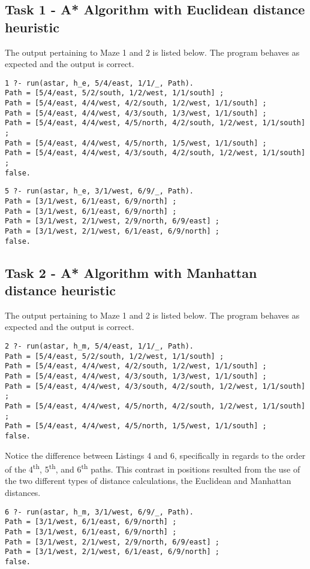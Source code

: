 \documentclass[11pt]{article}
\newcommand{\forceindent}{\leavevmode{\parindent=1em\indent}}
\newcommand{\ts}{\textsuperscript}
\begin{document}
\subsection{Task 1 - A* Algorithm with Euclidean distance heuristic}
The output pertaining to Maze 1 and 2 is listed below. The program behaves as expected and the output is correct.	
\begin{lstlisting}
1 ?- run(astar, h_e, 5/4/east, 1/1/_, Path).
Path = [5/4/east, 5/2/south, 1/2/west, 1/1/south] ;
Path = [5/4/east, 4/4/west, 4/2/south, 1/2/west, 1/1/south] ;
Path = [5/4/east, 4/4/west, 4/3/south, 1/3/west, 1/1/south] ;
Path = [5/4/east, 4/4/west, 4/5/north, 4/2/south, 1/2/west, 1/1/south] ;
Path = [5/4/east, 4/4/west, 4/5/north, 1/5/west, 1/1/south] ;
Path = [5/4/east, 4/4/west, 4/3/south, 4/2/south, 1/2/west, 1/1/south] ;
false.	
\end{lstlisting}
\vspace{2 mm}
\begin{lstlisting}
5 ?- run(astar, h_e, 3/1/west, 6/9/_, Path).
Path = [3/1/west, 6/1/east, 6/9/north] ;
Path = [3/1/west, 6/1/east, 6/9/north] ;
Path = [3/1/west, 2/1/west, 2/9/north, 6/9/east] ;
Path = [3/1/west, 2/1/west, 6/1/east, 6/9/north] ;
false.	
\end{lstlisting}
\subsection{Task 2 - A* Algorithm with Manhattan distance heuristic}
The output pertaining to Maze 1 and 2 is listed below. The program behaves as expected and the output is correct.	
\begin{lstlisting}
2 ?- run(astar, h_m, 5/4/east, 1/1/_, Path).
Path = [5/4/east, 5/2/south, 1/2/west, 1/1/south] ;
Path = [5/4/east, 4/4/west, 4/2/south, 1/2/west, 1/1/south] ;
Path = [5/4/east, 4/4/west, 4/3/south, 1/3/west, 1/1/south] ;
Path = [5/4/east, 4/4/west, 4/3/south, 4/2/south, 1/2/west, 1/1/south] ;
Path = [5/4/east, 4/4/west, 4/5/north, 4/2/south, 1/2/west, 1/1/south] ;
Path = [5/4/east, 4/4/west, 4/5/north, 1/5/west, 1/1/south] ;
false.	
\end{lstlisting}
\vspace{2 mm}
\forceindent Notice the difference between Listings 4 and 6, specifically in regards to the order of the 4\ts{th}, 5\ts{th}, and 6\ts{th} paths. This contrast in positions resulted from the use of the two different types of distance calculations, the Euclidean and Manhattan distances.
\begin{lstlisting}
6 ?- run(astar, h_m, 3/1/west, 6/9/_, Path).
Path = [3/1/west, 6/1/east, 6/9/north] ;
Path = [3/1/west, 6/1/east, 6/9/north] ;
Path = [3/1/west, 2/1/west, 2/9/north, 6/9/east] ;
Path = [3/1/west, 2/1/west, 6/1/east, 6/9/north] ;
false.	
\end{lstlisting}
\end{document}
